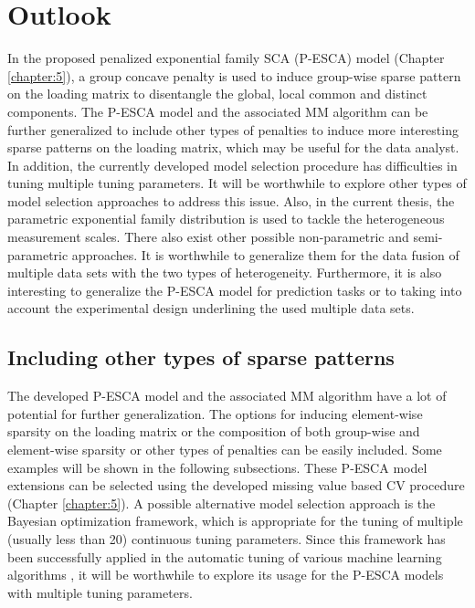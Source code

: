 \chapter{Outlook} \label{chapter:6}
In the proposed penalized exponential family SCA (P-ESCA) model (Chapter \ref{chapter:5}), a group concave penalty is used to induce group-wise sparse pattern on the loading matrix to disentangle the global, local common and distinct components. The P-ESCA model and the associated MM algorithm can be further generalized to include other types of penalties to induce more interesting sparse patterns on the loading matrix, which may be useful for the data analyst. In addition, the currently developed model selection procedure has difficulties in tuning multiple tuning parameters. It will be worthwhile to explore other types of model selection approaches to address this issue. Also, in the current thesis, the parametric exponential family distribution is used to tackle the heterogeneous measurement scales. There also exist other possible non-parametric and semi-parametric approaches. It is worthwhile to generalize them for the data fusion of multiple data sets with the two types of heterogeneity. Furthermore, it is also interesting to generalize the P-ESCA model for prediction tasks or to taking into account the experimental design underlining the used multiple data sets.

\section{Including other types of sparse patterns}
The developed P-ESCA model and the associated MM algorithm have a lot of potential for further generalization. The options for inducing element-wise sparsity on the loading matrix or the composition of both group-wise and element-wise sparsity or other types of penalties can be easily included. Some examples will be shown in the following subsections. These P-ESCA model extensions can be selected using the developed missing value based CV procedure (Chapter \ref{chapter:5}). A possible alternative model selection approach is the Bayesian optimization \cite{frazier2018tutorial} framework, which is appropriate for the tuning of multiple (usually less than 20) continuous tuning parameters. Since this framework has been successfully applied in the automatic tuning of various machine learning algorithms \cite{snoek2012practical}, it will be worthwhile to explore its usage for the P-ESCA models with multiple tuning parameters.


